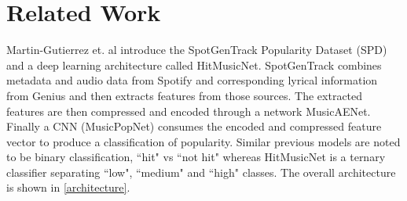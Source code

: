 \documentclass[11pt]{article}
\begin{document}
% 
%
% 


\section{Related Work}

Martin-Gutierrez et. al \cite{martin-gutierrez_multimodal_2020} introduce the SpotGenTrack Popularity Dataset (SPD) and a deep learning architecture called HitMusicNet. SpotGenTrack combines metadata and audio data from Spotify and corresponding lyrical information from Genius and then extracts features from those sources. The extracted features are then compressed and encoded through a network MusicAENet. Finally a CNN (MusicPopNet) consumes the encoded and compressed feature vector to produce a classification of popularity. Similar previous models are noted to be binary classification, ``hit" vs ``not hit" whereas HitMusicNet is a ternary classifier separating ``low", ``medium" and ``high" classes. The overall architecture is shown in \ref{architecture}.
    
\end{document}
